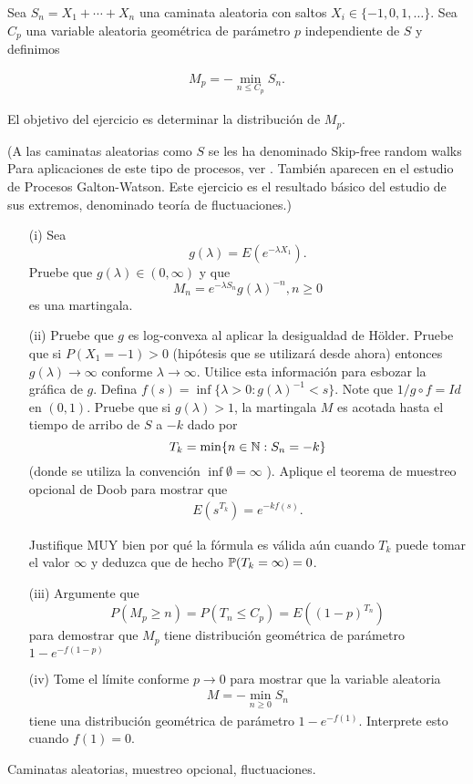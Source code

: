 \begin{problema}
		Sea $S_n=X_1+\cdots+X_n$ una caminata aleatoria con saltos $X_i\in \{-1,0,1,\ldots\}$. 
		Sea \(C_p\) una variable aleatoria geom\'etrica de par\'ametro $p$ independiente de \(S\) y definimos 
		
		\begin{align}
			M_p=-\min_{n\leq C_p} S_n. 
		\end{align}
		
		El objetivo del ejercicio es determinar la distribuci\'on de $M_p$.

		(A las caminatas aleatorias como $S$ se les ha denominado Skip-free random walks Para aplicaciones de este tipo 
		de procesos, ver \cite{MR1978607}. Tambi\'en aparecen en el estudio de Procesos Galton-Watson. 
		Este ejercicio es el resultado b\'asico del estudio de sus extremos, denominado teor\'ia de fluctuaciones.)

	\begin{enumerate}
		
		\item[(i)] 	
					Sea$$g(\lambda)=E(e^{- \lambda X_1}).$$Pruebe que \(g(\lambda)\in (0,\infty)\) y que$$M_n=e^{-\lambda S_n}g(\lambda)^{-n},n\geq 0$$es una martingala.
		
		\item[(ii)] 
					Pruebe que \(g\) es log-convexa al aplicar la desigualdad de H\"older. Pruebe que si \(P(X_1=-1)>0\) (hip\'otesis que se utilizar\'a desde ahora) 
					entonces \(g(\lambda)\to\infty\) conforme \(\lambda\to\infty\). Utilice esta informaci\'on para esbozar la gr\'afica de \(g\). 
					Defina \( f(s)=\inf \{ \lambda>0:g(\lambda)^{-1} < s\} \). Note que \(1/g\circ f=Id\) en \((0,1)\). Pruebe que si \(g(\lambda)>1\), 
					la martingala \(M\) es acotada hasta el tiempo de arribo de \(S\) a \(-k\) dado por $$ T_k =\min \{n\in\mathbb{N}:S_n=-k\} $$
					(donde se utiliza la convenci\'on \(\inf\emptyset=\infty\) ). Aplique el teorema de muestreo opcional de Doob para mostrar que 
					\begin{align}
						E(s^{T_k})=e^{-k f(s)}.
					\end{align}
					
					Justifique MUY bien por qu\'e la f\'ormula es válida aún cuando \(T_k\) puede tomar el valor \(\infty\) y deduzca que de hecho \( \mathbb{P}  (T_k=\infty)=0\).
		
		\item[(iii)] 
					Argumente que$$ P(M_p\geq n)=P(T_n\leq C_p)=E((1-p)^{T_n})$$ para demostrar que \(M_p\) tiene distribuci\'on geom\'etrica de par\'ametro \(1-e^{-f(1-p)}\)
		
		\item[(iv)] 
					Tome el límite conforme \(p\to 0\) para mostrar que la variable aleatoria 
					\begin{align}
						M=-\min_{n\geq 0}S_n
					\end{align}
					tiene una distribuci\'on geom\'etrica de par\'ametro $1-e^{-f(1)}$. Interprete esto cuando $f(1)=0$.
	\end{enumerate}

		 Caminatas aleatorias, muestreo opcional, fluctuaciones.
\end{problema}
